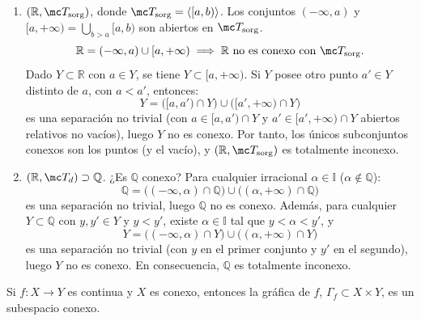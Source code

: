 \begin{ejems}
\begin{enumerate}
    Si $Y \subset \mathbb{R}$ (no vacío) admite una descomposición $Y = (U \cap Y) \cup (V \cap Y)$ con $\emptyset = (U \cap Y) \cap (V \cap Y) = (U \cap V) \cap Y$, como $U \cap V$ es uno de ellos:
    \[
        \Rightarrow \begin{cases} U = \emptyset \text{ y } V \text{ total} \\ V = \emptyset \text{ y } U \text{ total} \end{cases}
        \Rightarrow Y \text{ no admite separaciones no triviales} \Rightarrow Y \text{ conexo.}
    \]
    (\emph{«Cualquier subespacio de $(\mathbb{R}, \mc T_{\mathrm{kol}})$ es conexo»}.)
    \item $(\mathbb{R}, \mc T_{\mathrm{sorg}})$, donde $\mc T_{\mathrm{sorg}} = \langle [a,b) \rangle$. Los conjuntos $(-\infty, a)$ y $[a, +\infty) = \bigcup_{b > a} [a,b)$ son abiertos en $\mc T_{\mathrm{sorg}}$.
    \[
        \mathbb{R} = (-\infty, a) \cup [a, +\infty) \implies \mathbb{R} \text{ no es conexo con } \mc T_{\mathrm{sorg}}.
    \]
    Dado $Y \subset \mathbb{R}$ con $a \in Y$, se tiene $Y \subset [a, +\infty)$. Si $Y$ posee otro punto $a' \in Y$ distinto de $a$, con $a < a'$, entonces:
    \[
        Y = \big([a, a') \cap Y\big) \cup \big([a', +\infty) \cap Y\big)
    \]
    es una separación no trivial (con $a \in [a, a') \cap Y$ y $a' \in [a', +\infty) \cap Y$ abiertos relativos no vacíos), luego $Y$ no es conexo. Por tanto, los únicos subconjuntos conexos son los puntos (y el vacío), y $(\mathbb{R}, \mc T_{\mathrm{sorg}})$ es totalmente inconexo.

    \item $(\mathbb{R}, \mc T_d) \supset \mathbb{Q}$. ¿Es $\mathbb{Q}$ conexo?
    Para cualquier irracional $\alpha \in \mathbb{I}$ ($\alpha \notin \mathbb{Q}$):
    \[
        \mathbb{Q} = \big((-\infty, \alpha) \cap \mathbb{Q}\big) \cup \big((\alpha, +\infty) \cap \mathbb{Q}\big)
    \]
    es una separación no trivial, luego $\mathbb{Q}$ no es conexo. Además, para cualquier $Y \subset \mathbb{Q}$ con $y, y' \in Y$ y $y < y'$, existe $\alpha \in \mathbb{I}$ tal que $y < \alpha < y'$, y
    \[
        Y = \big((-\infty, \alpha) \cap Y\big) \cup \big((\alpha, +\infty) \cap Y\big)
    \]
    es una separación no trivial (con $y$ en el primer conjunto y $y'$ en el segundo), luego $Y$ no es conexo. En consecuencia, $\mathbb{Q}$ es totalmente inconexo.
\end{enumerate}
\end{ejems}
\begin{cor}
Si $f \colon X \to Y$ es continua y $X$ es conexo, entonces la gráfica de $f$, $\Gamma_f \subset X \times Y$, es un subespacio conexo.
\end{cor}

